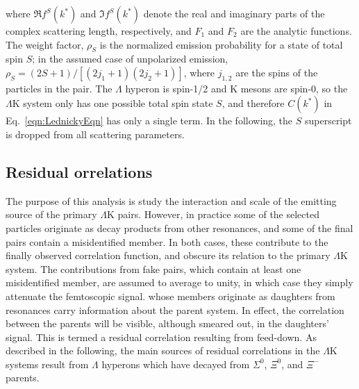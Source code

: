 \documentclass[ALICE,manyauthors]{cernphprep}
\newcommand{\Lam}{$\Lambda$\xspace}
\newcommand{\LamK}{$\Lambda$K\xspace}
\begin{document}
where $\Re f^{S}(k^{*})$ and $\Im f^{S}(k^{*})$ denote the real and imaginary parts of the complex scattering length, respectively, and $F_{1}$ and $F_{2}$ are the analytic functions.
The weight factor, $\rho_{S}$ is the normalized emission probability for a state of total spin $S$; in the assumed case of unpolarized emission, $\rho_{S} = (2S+1)/[(2j_{1}+1)(2j_{2}+1)]$, where $j_{1,2}$ are the spins of the particles in the pair.
The \Lam hyperon is spin-1/2 and K mesons are spin-0, so the \LamK system only has one possible total spin state $S$, and therefore $C(k^{*})$ in Eq.~\ref{eqn:LednickyEqn} has only a single term.
In the following, the $S$ superscript is dropped from all scattering parameters.

\subsection{Residual {\color{red}{C}}{\color{blue}{c}}orrelations}
\label{ResidualCorrelations}

The purpose of this analysis is {\color{blue}{to}} study the interaction and scale of the emitting source of the primary \LamK pairs.
However, in practice some of the selected particles originate as decay products from other resonances, and some of the final pairs contain a misidentified member.
In both cases, these contribute to the finally observed correlation function, and obscure its relation to the primary \LamK system.
The contributions from fake pairs, which contain at least one misidentified member, are assumed to average to unity, in which case they simply attenuate the femtoscopic signal.
{\color{red}{Those pairs}} {\color{blue}{Pairs}} whose members originate as daughters from resonances carry information about the parent system.
In effect, the correlation between the parents will be visible, although smeared out, in the daughters' signal.
This is termed a residual correlation resulting from feed-down.  
As described in the following, the main sources of residual correlations in the \LamK systems result from \Lam hyperons which have decayed from $\Sigma^{0}$, $\Xi^{0}$, and $\Xi^{-}$ parents.
\end{document}
